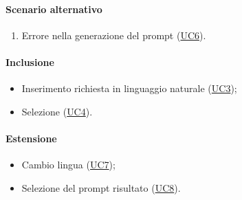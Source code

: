 \paragraph*{Scenario alternativo}
\begin{enumerate}
  \item Errore nella generazione del prompt (\hyperref[UC6]{UC6}).
\end{enumerate}

\paragraph*{Inclusione}
\begin{itemize}
  \item Inserimento richiesta in linguaggio naturale (\hyperref[UC3]{UC3});
  \item Selezione  (\hyperref[UC4]{UC4}).
\end{itemize}

\paragraph*{Estensione}
\begin{itemize}
  \item Cambio lingua (\hyperref[UC7]{UC7});
  \item Selezione del prompt risultato (\hyperref[UC8]{UC8}).
\end{itemize}
